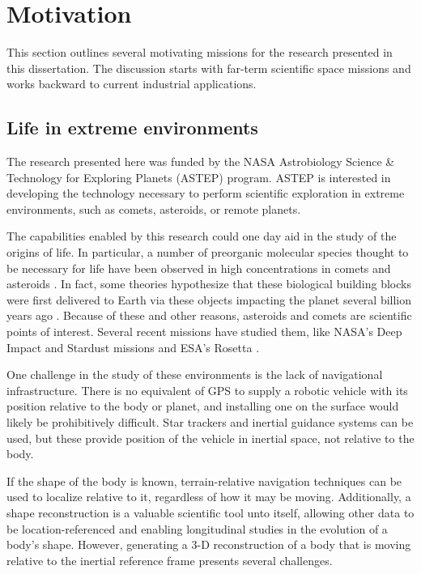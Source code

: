 \section{Motivation}

This section outlines several motivating missions for the research presented in this dissertation. The discussion starts with far-term scientific space missions and works backward to current industrial applications.

\subsection{Life in extreme environments}

The research presented here was funded by the NASA Astrobiology Science \& Technology for Exploring Planets (ASTEP) program. ASTEP is interested in developing the technology necessary to perform scientific  exploration in extreme environments, such as comets, asteroids, or remote planets.

The capabilities enabled by this research could one day aid in the study of the origins of life. In particular, a number of preorganic molecular species thought to be necessary for life have been observed in high concentrations in comets and asteroids \cite{Fomenkova1999}. In fact, some theories hypothesize that these biological building blocks were first delivered to Earth via these objects impacting the planet several billion years ago \cite{Chyba1992}. Because of these and other reasons, asteroids and comets are scientific points of interest. Several recent missions have studied them, like NASA's Deep Impact and Stardust missions\cite{Ahearn2005,Willcockson1999} and ESA's Rosetta \cite{Bibring2007}.

One challenge in the study of these environments is the lack of navigational infrastructure. There is no equivalent of GPS to supply a robotic vehicle with its position relative to the body or planet, and installing one on the surface would likely be prohibitively difficult. Star trackers and inertial guidance systems can be used, but these provide position of the vehicle in inertial space, not relative to the body.

If the shape of the body is known, terrain-relative navigation techniques can be used to localize relative to it, regardless of how it may be moving. Additionally, a shape reconstruction is a valuable scientific tool unto itself, allowing other data to be location-referenced and enabling longitudinal studies in the evolution of a body's shape. However, generating a 3-D reconstruction of a body that is moving relative to the inertial reference frame presents several challenges.

